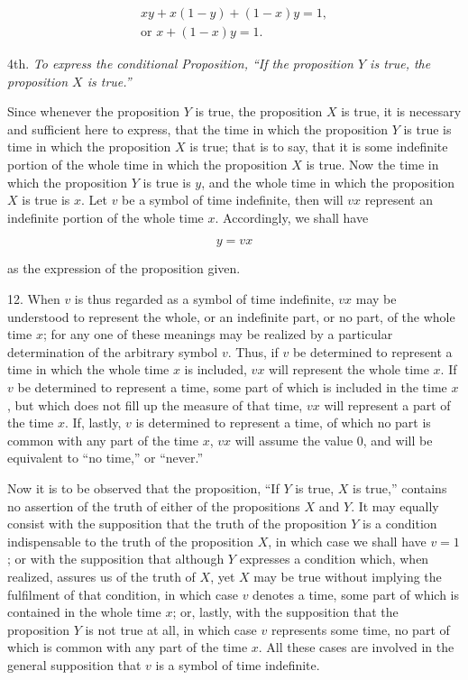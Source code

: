 \documentclass[oneside]{book}
\begin{document}
\begin{eqnarray}
xy + x(1-y) + (1-x)y = 1, \nonumber \\
\textrm{or }x + (1 - x)y = 1.
\end{eqnarray}

4th. \textit{To express the conditional Proposition, ``If the
proposition $Y$ is true, the proposition $X$ is true.''}

Since whenever the proposition $Y$ is true, the proposition $X$
is true, it is necessary and sufficient here to express, that the time
in which the proposition $Y$ is true is time in which the
proposition $X$ is true; that is to say, that it is some indefinite portion
of the whole time in which the proposition $X$ is true. Now the
time in which the proposition $Y$ is true is $y$, and the whole time
in which the proposition $X$ is true is $x$. Let $v$ be a symbol of
time indefinite, then will $vx$ represent an indefinite portion of the
whole time $x$. Accordingly, we shall have

\[
y = vx
\]

as the expression of the proposition given.

12. When $v$ is thus regarded as a symbol of time indefinite,
$vx$ may be understood to represent the whole, or an indefinite
part, or no part, of the whole time $x$; for any one of these
meanings may be realized by a particular determination of the arbitrary
symbol $v$. Thus, if $v$ be determined to represent a time in which
the whole time $x$ is included, $vx$ will represent the whole time $x$.
If $v$ be determined to represent a time, some part of which is included
in the time $x$, but which does not fill up the measure of
that time, $vx$ will represent a part of the time $x$. If, lastly, $v$ is
determined to represent a time, of which no part is common with
any part of the time $x$, $vx$ will assume the value 0, and will be
equivalent to ``no time,'' or ``never.''

Now it is to be observed that the proposition, ``If $Y$ is true,
$X$ is true,'' contains no assertion of the truth of either of the
propositions $X$ and $Y$. It may equally consist with the
supposition that the truth of the proposition $Y$ is a condition
indispensable to the truth of the proposition $X$, in which case we
shall have $v=1$; or with the supposition that although $Y$
expresses a condition which, when realized, assures us of the truth
of $X$, yet $X$ may be true without implying the fulfilment of that
condition, in which case $v$ denotes a time, some part of which is
contained in the whole time $x$; or, lastly, with the supposition
that the proposition $Y$ is not true at all, in which case $v$
represents some time, no part of which is common with any part of
the time $x$. All these cases are involved in the general
supposition that $v$ is a symbol of time indefinite.
\end{document}
